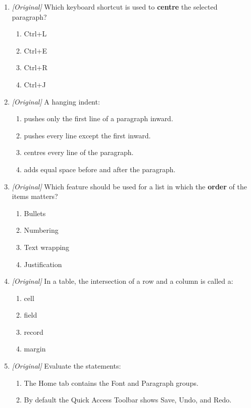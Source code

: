 \begin{enumerate}[label=\textbf{Q\arabic*.}, leftmargin=*]
\begin{enumerate}[label=\Alph*.]
    \item Right
    \item Justify
  \end{enumerate}
\item \textit{[Original]} Which keyboard shortcut is used to \textbf{centre}
  the selected paragraph?
  \begin{enumerate}[label=\Alph*.]
    \item Ctrl+L
    \item Ctrl+E
    \item Ctrl+R
    \item Ctrl+J
  \end{enumerate}
\item \textit{[Original]} A hanging indent:
  \begin{enumerate}[label=\Alph*.]
    \item pushes only the first line of a paragraph inward.
    \item pushes every line except the first inward.
    \item centres every line of the paragraph.
    \item adds equal space before and after the paragraph.
  \end{enumerate}
\item \textit{[Original]} Which feature should be used for a list in which
  the \textbf{order} of the items matters?
  \begin{enumerate}[label=\Alph*.]
    \item Bullets
    \item Numbering
    \item Text wrapping
    \item Justification
  \end{enumerate}
\item \textit{[Original]} In a table, the intersection of a row and a column
  is called a:
  \begin{enumerate}[label=\Alph*.]
    \item cell
    \item field
    \item record
    \item margin
  \end{enumerate}
\item \textit{[Original]} Evaluate the statements:
  \begin{enumerate}[label=\Roman*.]
    \item The Home tab contains the Font and Paragraph groups.
    \item By default the Quick Access Toolbar shows Save, Undo, and Redo.

\end{enumerate}
\end{enumerate}
